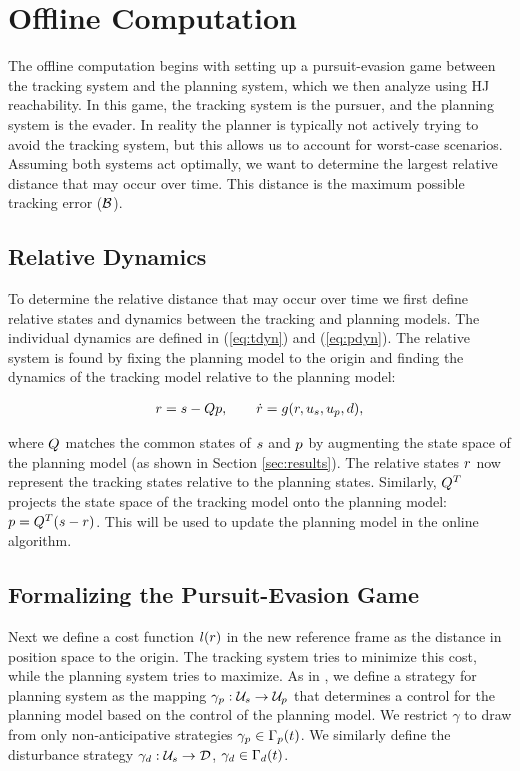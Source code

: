 \section{Offline Computation \label{sec:precomp}}
The offline computation begins with setting up a pursuit-evasion game \cite{Huang11, Chen17} between the tracking system and the planning system, which we then analyze using HJ reachability. In this game, the tracking system is the pursuer, and the planning system is the evader. In reality the planner is typically not actively trying to avoid the tracking system, but this allows us to account for worst-case scenarios. Assuming both systems act optimally, we want to determine the largest relative distance that may occur over time. This distance is the maximum possible tracking error ($\mathcal B$).

\subsection{Relative Dynamics}
To determine the relative distance that may occur over time we first define relative states and dynamics between the tracking and planning models. The individual dynamics are defined in (\ref{eq:tdyn}) and (\ref{eq:pdyn}). The relative system is found by fixing the planning model to the origin and finding the dynamics of the tracking model relative to the planning model:

\begin{equation}
\label{eq:rdyn}
\begin{aligned}
r = s - Qp, \qquad \dot{r} = g(r, u_s, u_p, d),
\end{aligned}
\end{equation}

\noindent where $Q$ matches the common states of $s$ and $p$ by augmenting the state space of the planning model (as shown in Section \ref{sec:results}). The relative states $r$ now represent the tracking states relative to the planning states. Similarly, $Q^T$ projects the state space of the tracking model onto the planning model: $p = Q^T(s-r)$. This will be used to update the planning model in the online algorithm.

\subsection{Formalizing the Pursuit-Evasion Game}
Next we define a cost function $l(r)$ in the new reference frame as the distance in position space to the origin. The tracking system tries to minimize this cost, while the planning system tries to maximize. As in \cite{Mitchell05}, we define a strategy for planning system as the mapping $\gamma_{p} : \mathcal{U}_s \rightarrow \mathcal{U}_p$ that determines a control for the planning model based on the control of the planning model. We restrict $\gamma$ to draw from only non-anticipative strategies $\gamma_{p} \in \Gamma_p(t)$. We similarly define the disturbance strategy $\gamma_{d}: \mathcal{U}_s \rightarrow \mathcal{D}$, $\gamma_{d} \in \Gamma_d(t)$.


